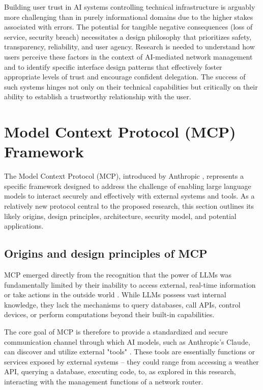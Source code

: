 Building user trust in AI systems controlling technical infrastructure is arguably more challenging than in purely informational domains due to the higher stakes associated with errors. The potential for tangible negative consequences (loss of service, security breach) necessitates a design philosophy that prioritizes safety, transparency, reliability, and user agency. Research is needed to understand how users perceive these factors in the context of AI-mediated network management and to identify specific interface design patterns that effectively foster appropriate levels of trust and encourage confident delegation. The success of such systems hinges not only on their technical capabilities but critically on their ability to establish a trustworthy relationship with the user.

\section{Model Context Protocol (MCP) Framework}
The Model Context Protocol (MCP), introduced by Anthropic \cite{mcp_docs}, represents a specific framework designed to address the challenge of enabling large language models to interact securely and effectively with external systems and tools. As a relatively new protocol central to the proposed research, this section outlines its likely origins, design principles, architecture, security model, and potential applications.

\subsection{Origins and design principles of MCP}
MCP emerged directly from the recognition that the power of LLMs was fundamentally limited by their inability to access external, real-time information or take actions in the outside world \cite{mcp_docs}. While LLMs possess vast internal knowledge, they lack the mechanisms to query databases, call APIs, control devices, or perform computations beyond their built-in capabilities.

The core goal of MCP is therefore to provide a standardized and secure communication channel through which AI models, such as Anthropic's Claude, can discover and utilize external "tools" \cite{mcp_docs}. These tools are essentially functions or services exposed by external systems – they could range from accessing a weather API, querying a database, executing code, to, as explored in this research, interacting with the management functions of a network router.

